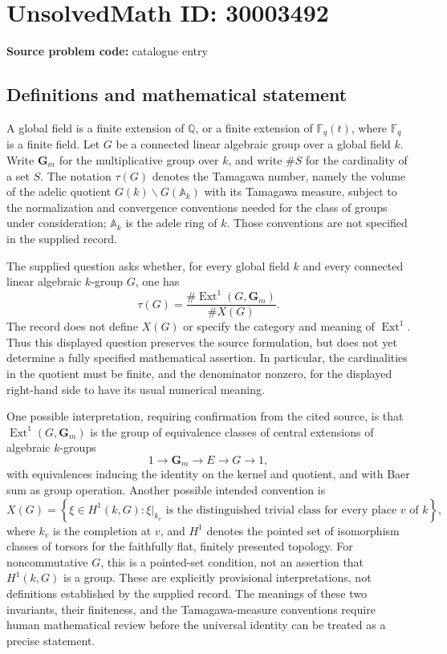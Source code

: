 \documentclass[11pt]{article}
\newcommand{\Q}{\mathbb{Q}}
\newcommand{\F}{\mathbb{F}}
\begin{document}
\section*{UnsolvedMath ID: 30003492}
\textbf{Source problem code:} catalogue entry
\subsection{Definitions and mathematical statement}
A global field is a finite extension of \(\Q\), or a finite extension of \(\F_q(t)\), where \(\F_q\) is a finite field. Let \(G\) be a connected linear algebraic group over a global field \(k\). Write \(\mathbf G_m\) for the multiplicative group over \(k\), and write \(\#S\) for the cardinality of a set \(S\). The notation \(\tau(G)\) denotes the Tamagawa number, namely the volume of the adelic quotient \(G(k)\backslash G(\mathbb A_k)\) with its Tamagawa measure, subject to the normalization and convergence conventions needed for the class of groups under consideration; \(\mathbb A_k\) is the adele ring of \(k\). Those conventions are not specified in the supplied record.

The supplied question asks whether, for every global field \(k\) and every connected linear algebraic \(k\)-group \(G\), one has
\[
\tau(G)=\frac{\#\operatorname{Ext}^{1}(G,\mathbf G_m)}{\#X(G)}.
\]
The record does not define \(X(G)\) or specify the category and meaning of \(\operatorname{Ext}^{1}\). Thus this displayed question preserves the source formulation, but does not yet determine a fully specified mathematical assertion. In particular, the cardinalities in the quotient must be finite, and the denominator nonzero, for the displayed right-hand side to have its usual numerical meaning.

One possible interpretation, requiring confirmation from the cited source, is that \(\operatorname{Ext}^{1}(G,\mathbf G_m)\) is the group of equivalence classes of central extensions of algebraic \(k\)-groups
\[
1\longrightarrow\mathbf G_m\longrightarrow E\longrightarrow G\longrightarrow1,
\]
with equivalences inducing the identity on the kernel and quotient, and with Baer sum as group operation. Another possible intended convention is
\[
X(G)=\left\{\xi\in H^1(k,G):\xi|_{k_v}\text{ is the distinguished trivial class for every place }v\text{ of }k\right\},
\]
where \(k_v\) is the completion at \(v\), and \(H^1\) denotes the pointed set of isomorphism classes of torsors for the faithfully flat, finitely presented topology. For noncommutative \(G\), this is a pointed-set condition, not an assertion that \(H^1(k,G)\) is a group. These are explicitly provisional interpretations, not definitions established by the supplied record. The meanings of these two invariants, their finiteness, and the Tamagawa-measure conventions require human mathematical review before the universal identity can be treated as a precise statement.
\end{document}
